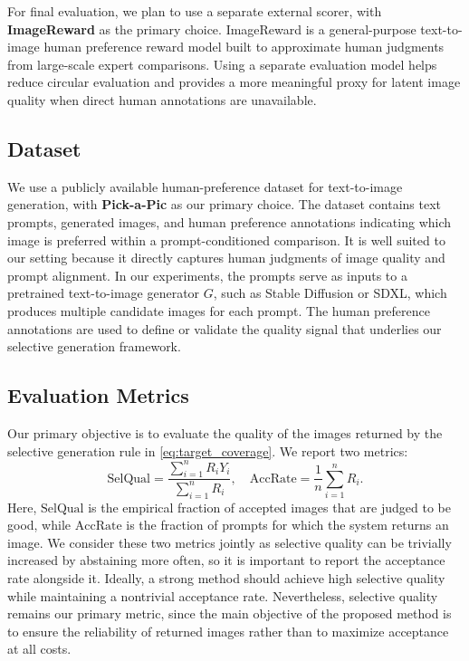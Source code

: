 \documentclass[twocolumn,11pt]{article}
\theoremstyle{plain}
\theoremstyle{definition}
\theoremstyle{remark}
\begin{document}
For final evaluation, we plan to use a separate external scorer, with \textbf{ImageReward} as the primary choice. ImageReward is a general-purpose text-to-image human preference reward model built to approximate human judgments from large-scale expert comparisons. Using a separate evaluation model helps reduce circular evaluation and provides a more meaningful proxy for latent image quality when direct human annotations are unavailable.


\subsection{Dataset}

We use a publicly available human-preference dataset for text-to-image generation, with \textbf{Pick-a-Pic} \citep{kirstain2023pick} as our primary choice. The dataset contains text prompts, generated images, and human preference annotations indicating which image is preferred within a prompt-conditioned comparison. It is well suited to our setting because it directly captures human judgments of image quality and prompt alignment.
In our experiments, the prompts serve as inputs to a pretrained text-to-image generator \(G\), such as Stable Diffusion or SDXL, which produces multiple candidate images for each prompt. The human preference annotations are used to define or validate the quality signal that underlies our selective generation framework.

\subsection{Evaluation Metrics}

Our primary objective is to evaluate the quality of the images returned by the selective generation rule in \eqref{eq:target_coverage}. We report two metrics:
\[
\mathrm{SelQual}
=
\frac{\sum_{i=1}^n R_i Y_i}{\sum_{i=1}^n R_i},
\quad
\mathrm{AccRate}
=
\frac{1}{n}\sum_{i=1}^n R_i.
\]
Here, \(\mathrm{SelQual}\) is the empirical fraction of accepted images that are judged to be good, while \(\mathrm{AccRate}\) is the fraction of prompts for which the system returns an image. We consider these two metrics jointly as selective quality can be trivially increased by abstaining more often, so it is important to report the acceptance rate alongside it. Ideally, a strong method should achieve high selective quality while maintaining a nontrivial acceptance rate. Nevertheless, selective quality remains our primary metric, since the main objective of the proposed method is to ensure the reliability of returned images rather than to maximize acceptance at all costs.
\end{document}
